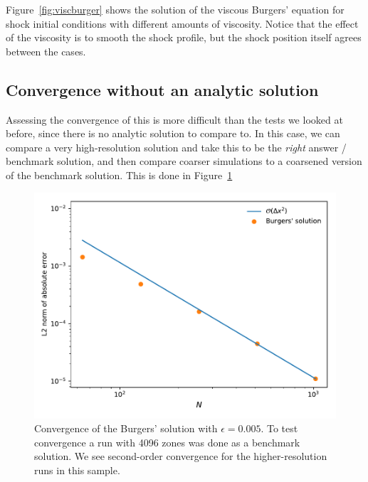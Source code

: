 Figure~\ref{fig:viscburger} shows the solution of the viscous Burgers'
equation for shock initial conditions with different amounts of
viscosity.  Notice that the effect of the viscosity is to smooth the
shock profile, but the shock position itself agrees between the cases.


\subsection{Convergence without an analytic solution}

Assessing the convergence of this is more difficult than the tests we
looked at before, since there is no analytic solution to compare to.
In this case, we can compare a very high-resolution solution and take
this to be the {\em right} answer / benchmark solution, and then
compare coarser simulations to a coarsened version of the benchmark solution.
This is done in Figure~\ref{fig:multiphysics:burgersconverge}

\begin{figure}[t]
\centering
\includegraphics[width=5.0in]{burgersvisc_converge}
\caption[Convergence of the viscous Burgers' equation]
  {\label{fig:multiphysics:burgersconverge} Convergence of the Burgers'
    solution with $\epsilon = 0.005$.  To test convergence a run with 4096
    zones was done as a benchmark solution.  We see second-order
    convergence for the higher-resolution runs in this sample.\\
   }
\end{figure}

